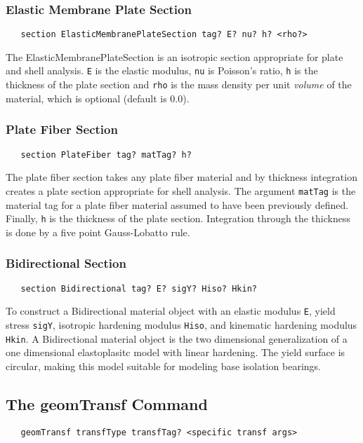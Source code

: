\documentclass[12pt]{article}
\begin{document}
\subsubsection{Elastic Membrane Plate Section}
{\sf\small
\begin{verbatim}
   section ElasticMembranePlateSection tag? E? nu? h? <rho?>
\end{verbatim}
}
The ElasticMembranePlateSection
is an isotropic section appropriate for plate and shell analysis.
{\tt E} is the elastic modulus, {\tt nu} is Poisson's ratio, 
{\tt h} is the thickness of the plate section and
{\tt rho} is the mass density per unit {\em volume} of the material,
which is optional (default is 0.0).


\subsubsection{Plate Fiber Section}
{\sf\small
\begin{verbatim}
   section PlateFiber tag? matTag? h?
\end{verbatim}
}
The plate fiber section takes any plate fiber material and by 
thickness integration creates a plate section appropriate for shell analysis.
The argument {\tt matTag} is the material tag for a plate
fiber material assumed to have been previously defined. Finally,
{\tt h} is the thickness of the plate section. Integration through the
thickness is done by a five point Gauss-Lobatto rule.

\subsubsection{Bidirectional Section}
{\sf\small
\begin{verbatim}
   section Bidirectional tag? E? sigY? Hiso? Hkin?
\end{verbatim}
}

To construct a Bidirectional material object with an elastic modulus
{\tt E}, yield stress {\tt sigY}, isotropic hardening modulus {\tt Hiso},
and kinematic hardening modulus {\tt Hkin}. A Bidirectional material
object is the two dimensional generalization of a one dimensional
elastoplasitc model with linear hardening. The yield surface is circular,
making this model suitable for modeling base isolation bearings.

\subsection{The geomTransf Command}
{\sf\small
\begin{verbatim}
   geomTransf transfType transfTag? <specific transf args>
\end{verbatim}
}
\end{document}
